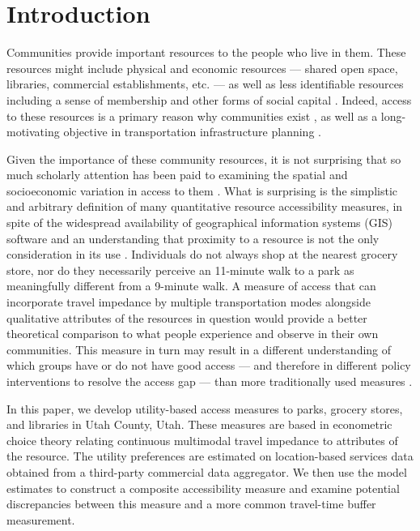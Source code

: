 \documentclass[ijerph,article,submit,moreauthors,pdftex]{mdpi}
\begin{document}

\hypertarget{intro}{%
\section{Introduction}\label{intro}}

Communities provide important resources to the people who live in them. These
resources might include physical and economic resources
--- shared open space, libraries, commercial establishments, etc. --- as well as less identifiable resources
including a sense of membership and other forms of social capital
\citep{lochner1999}. Indeed, access to these resources is a primary reason why
communities exist \citep{muth1971}, as well as a long-motivating objective in
transportation infrastructure planning \citep{hansen1959}.

Given the importance of these community resources, it is not surprising that
so much scholarly attention has been paid to examining the spatial and
socioeconomic variation in access to them \citep{handy1997, witten2003}. What
is surprising is the simplistic and arbitrary definition of many
quantitative resource accessibility measures, in spite of the widespread
availability of geographical information systems (GIS) software \citep{logan2019} and
an understanding that proximity to a resource is not the only consideration
in its use \citep{dong2006}. Individuals do not always shop at the nearest grocery
store, nor do they necessarily perceive an 11-minute walk to a park as
meaningfully different from a 9-minute walk. A measure of access that can
incorporate travel impedance by multiple transportation modes alongside
qualitative attributes of the resources in question would provide a better
theoretical comparison to what people experience and observe in their own
communities. This measure in turn may result in a different understanding
of which groups have or do not have good access --- and therefore in different
policy interventions to resolve the access gap --- than more traditionally used
measures \citep{logan2019, macfarlane2020}.

In this paper, we develop utility-based access measures to parks, grocery stores, and
libraries in Utah County, Utah. These measures are based in econometric choice
theory relating continuous multimodal travel impedance to attributes of the
resource. The utility preferences are estimated on location-based services data
obtained from a third-party commercial data aggregator. We then use the model
estimates to construct a composite accessibility measure and examine potential
discrepancies between this measure and a more common travel-time buffer
measurement.
\end{document}
